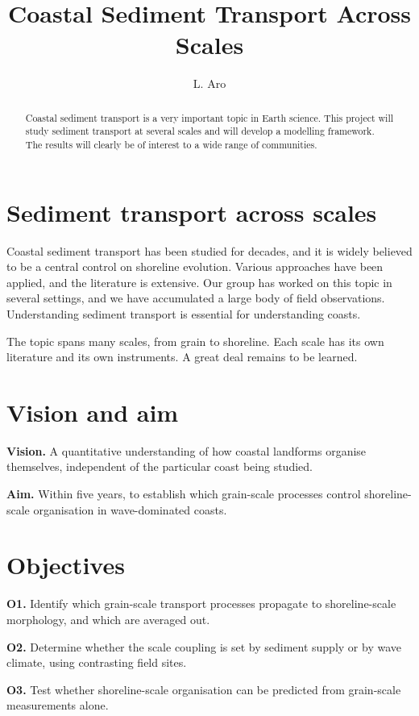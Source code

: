 \documentclass[11pt,a4paper]{article}
\title{Coastal Sediment Transport Across Scales}
\author[Aro]{L. Aro}
\begin{document}
\maketitle

\begin{abstract}
Coastal sediment transport is a very important topic in Earth science. This project
will study sediment transport at several scales and will develop a modelling
framework. The results will clearly be of interest to a wide range of communities.
\end{abstract}

\startsectiona

\section{Sediment transport across scales}
Coastal sediment transport has been studied for decades, and it is widely
believed to be a central control on shoreline evolution. Various approaches have been
applied, and the literature is extensive. Our group has worked on this topic in
several settings, and we have accumulated a large body of field observations.
Understanding sediment transport is essential for understanding coasts.

The topic spans many scales, from grain to shoreline. Each scale has its own
literature and its own instruments. A great deal remains to be learned.

\section{Vision and aim}
\textbf{Vision.} A quantitative understanding of how coastal landforms organise
themselves, independent of the particular coast being studied.

\textbf{Aim.} Within five years, to establish which grain-scale processes control
shoreline-scale organisation in wave-dominated coasts.

\section{Objectives}
\textbf{O1.} Identify which grain-scale transport processes propagate to
shoreline-scale morphology, and which are averaged out.

\textbf{O2.} Determine whether the scale coupling is set by sediment supply or by
wave climate, using contrasting field sites.

\textbf{O3.} Test whether shoreline-scale organisation can be predicted from
grain-scale measurements alone.
\end{document}

